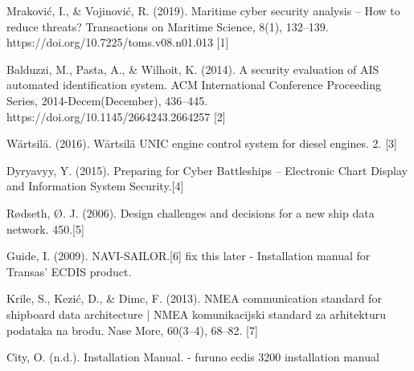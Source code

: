 \documentclass{report}
\begin{document}
Mraković, I., \& Vojinović, R. (2019). Maritime cyber security analysis – How to reduce threats? Transactions on Maritime Science, 8(1), 132–139. https://doi.org/10.7225/toms.v08.n01.013 [1]

Balduzzi, M., Pasta, A., \& Wilhoit, K. (2014). A security evaluation of AIS automated identification system. ACM International Conference Proceeding Series, 2014-Decem(December), 436–445. https://doi.org/10.1145/2664243.2664257 [2]

Wärtsilä. (2016). Wärtsilä UNIC engine control system for diesel engines. 2. [3]

Dyryavyy, Y. (2015). Preparing for Cyber Battleships – Electronic Chart Display and Information System Security.[4]

Rødseth, Ø. J. (2006). Design challenges and decisions for a new ship data network. 450.[5]

Guide, I. (2009). NAVI-SAILOR.[6] fix this later - Installation manual for Transas' ECDIS product.

Krile, S., Kezić, D., \& Dimc, F. (2013). NMEA communication standard for shipboard data architecture | NMEA komunikacijski standard za arhitekturu podataka na brodu. Nase More, 60(3–4), 68–82. [7]

City, O. (n.d.). Installation Manual. - furuno ecdis 3200 installation manual
\end{document}

